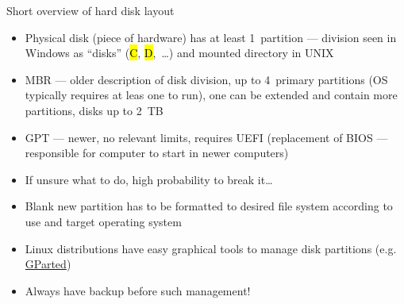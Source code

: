 \documentclass[compress, ucs, xelatex, 11pt, xcolor=svgnames,
  hyperref={
    bookmarks=true,
    unicode=true,
    colorlinks=true,
    pdftitle={Linux, command line and MetaCentrum},
    plainpages=false,
    pdfauthor={Vojtech Zeisek},
    pdfsubject={Course about use of Linux command line, writing shell scripts and using MetaCentrum of CESNET},
    pdfcreator={XeLaTeX},
    pdfkeywords={Linux, GNU, BASH, shell, command line, MetaCentrum},
    linkcolor=DarkRed,
    anchorcolor=DarkBlue,
    citecolor=Indigo,
    filecolor=NavyBlue,
    menucolor=DarkMagenta,
    urlcolor=DarkBlue,
    pdftex},
  url={hyphens, lowtilde} %
  ]{beamer}
\renewcommand{\texttt}[1]{\hl{\ttfamily #1}}
\begin{document}
\begin{frame}{Short overview of hard disk layout}
  \begin{itemize}
    \item Physical disk (piece of hardware) has at least 1~partition --- division seen in Windows as ``disks'' (\texttt{C}, \texttt{D},~\ldots) and mounted directory in UNIX
    \item MBR --- older description of disk division, up to 4~primary partitions (OS typically requires at leas one to run), one can be extended and contain more partitions, disks up to 2~TB
    \item GPT --- newer, no relevant limits, requires UEFI (replacement of BIOS --- responsible for computer to start in newer computers)
    \item If unsure what to do, high probability to break it\ldots
    \item Blank new partition has to be formatted to desired file system according to use and target operating system
    \item Linux distributions have easy graphical tools to manage disk partitions (e.g. \href{https://gparted.org/}{GParted})
    \item Always have backup before such management!
  \end{itemize}
\end{frame}
\end{document}
